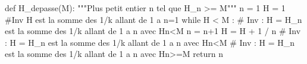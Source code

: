 \question{}
\begin{pyverbatim}
def H_depasse(M):
    """Plus petit entier n tel que H_n >= M"""
    n = 1
    H = 1
    #Inv H est la somme des 1/k allant de 1 a n=1
    while H < M : 
        # Inv : H = H_n est la somme des 1/k allant de 1 a n avec Hn<M
        n = n+1
        H = H + 1 / n
        # Inv : H = H_n est la somme des 1/k allant de 1 a n avec Hn<M
    # Inv : H = H_n est la somme des 1/k allant de 1 a n avec Hn>=M
    return n
\end{pyverbatim}
